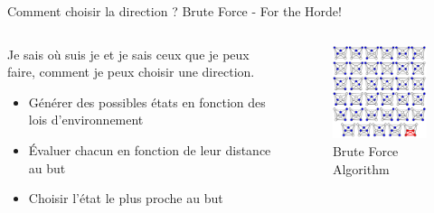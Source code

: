\documentclass{beamer}
\begin{document}

\begin{frame}{Comment choisir la direction ? Brute Force - For the Horde!}
  \begin{columns}
    \begin{column}{0.6\textwidth}
      \begin{block}{}

        Je sais où suis je et je sais ceux que je peux faire, comment je peux
        choisir une direction.
        \begin{itemize}
        \item Générer des possibles états en fonction des lois d'environnement
        \item Évaluer chacun en fonction de leur distance au but
        \item Choisir l'état le plus proche au but
        \end{itemize}

      \end{block}
    \end{column}
    \begin{column}{0.4\textwidth}
      \begin{block}{}
        \begin{figure}
          \centering
          \includegraphics[width=\textwidth]{bruteforce.png}
          \caption{Brute Force Algorithm}
          \label{fig:brute}
        \end{figure}
      \end{block}
    \end{column}
  \end{columns}
\end{frame}
\end{document}
